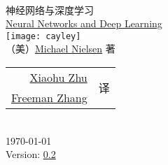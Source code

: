 
\begin{titlepage}
\begin{center}
  \hfill\\
  \vspace{1cm}
  {\fontsize{36pt}{40pt}\NotoSansSCBold{} 神经网络与深度学习}\\
  \vspace{1em}
  {\LARGE\RobotoRegular{} \href{http://neuralnetworksanddeeplearning.com/index.html}{Neural Networks and Deep Learning}}\\
  \vspace{1cm}
  \texttt{[image: cayley]}\\
  \vspace{1cm}
  {\LARGE （美）\href{http://michaelnielsen.org/}{Michael Nielsen} 著}\\
  \vspace{1cm}
  {\Large
    \begin{tabular}{rl}
      \href{mailto:xhzhu.nju@gmail}{Xiaohu Zhu} & \multirow{2}{*}{译} \\
      \href{mailto:zhanggyb@gmail.com}{Freeman Zhang} & \\
    \end{tabular}
  }\\
  \vfill
  {\large \today}\\
  \vspace{1em}
  {\large Version: \href{https://github.com/zhanggyb/nndl/releases/tag/0.2}{0.2}}
\end{center}
\end{titlepage}

